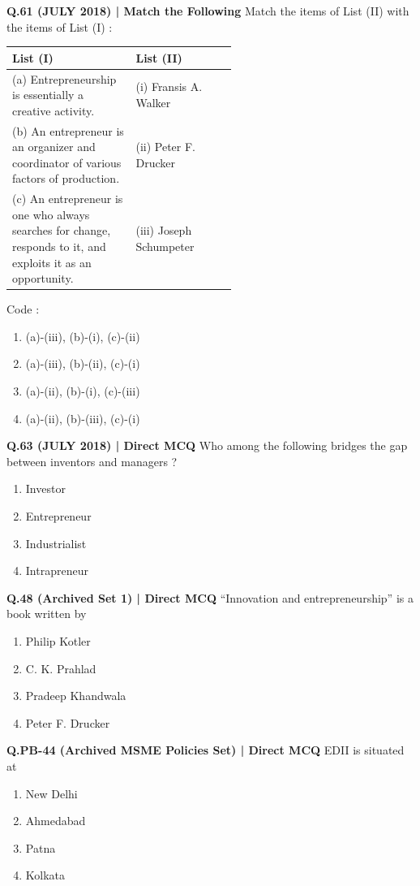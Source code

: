 \documentclass{article}
\begin{document}
\textbf{Q.61 (JULY 2018) | Match the Following}
Match the items of List (II) with the items of List (I) :
\begin{tabularx}{\linewidth}{@{} p{0.55\linewidth} X @{}}
    \toprule
    \textbf{List (I)} & \textbf{List (II)} \\
    \midrule
    (a) Entrepreneurship is essentially a creative activity. & (i) Fransis A. Walker \\
    (b) An entrepreneur is an organizer and coordinator of various factors of production. & (ii) Peter F. Drucker \\
    (c) An entrepreneur is one who always searches for change, responds to it, and exploits it as an opportunity. & (iii) Joseph Schumpeter \\
    \bottomrule
\end{tabularx}
Code :
\begin{enumerate}[label=(\arabic*)]
    \item (a)-(iii), (b)-(i), (c)-(ii)
    \item (a)-(iii), (b)-(ii), (c)-(i)
    \item (a)-(ii), (b)-(i), (c)-(iii)
    \item (a)-(ii), (b)-(iii), (c)-(i)
\end{enumerate}

\textbf{Q.63 (JULY 2018) | Direct MCQ}
Who among the following bridges the gap between inventors and managers ?
\begin{enumerate}[label=(\arabic*)]
    \item Investor
    \item Entrepreneur
    \item Industrialist
    \item Intrapreneur
\end{enumerate}

\textbf{Q.48 (Archived Set 1) | Direct MCQ}
“Innovation and entrepreneurship” is a book written by
\begin{enumerate}[label=(\arabic*)]
    \item Philip Kotler
    \item C. K. Prahlad
    \item Pradeep Khandwala
    \item Peter F. Drucker
\end{enumerate}

\textbf{Q.PB-44 (Archived MSME Policies Set) | Direct MCQ}
EDII is situated at
\begin{enumerate}[label=(\arabic*)]
    \item New Delhi
    \item Ahmedabad
    \item Patna
    \item Kolkata
\end{enumerate}
\end{document}
